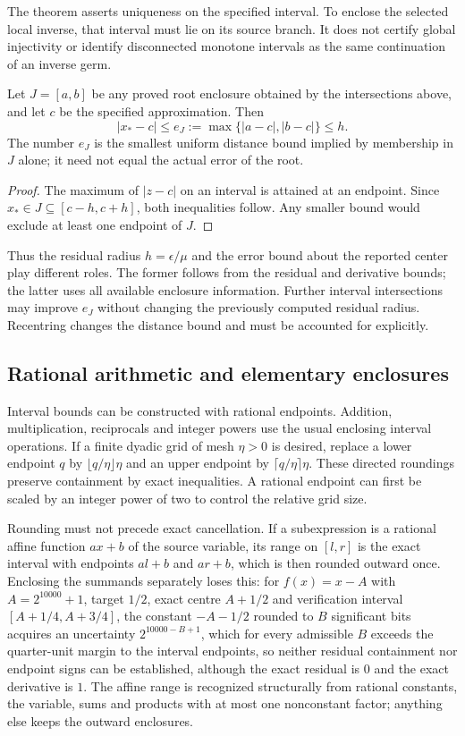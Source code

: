 The theorem asserts uniqueness on the specified interval. To enclose the selected local inverse, that interval must lie on its source branch. It does not
certify global injectivity or identify disconnected monotone intervals as the
same continuation of an inverse germ.

\begin{proposition}
\label{prop:sharp-enclosure-error}
Let $J=[a,b]$ be any proved root enclosure obtained by the intersections
above, and let $c$ be the specified approximation. Then
\[
 |x_*-c|\le e_J:=\max\{|a-c|,|b-c|\}\le h.
\]
The number $e_J$ is the smallest uniform distance bound implied by membership
in $J$ alone; it need not equal the actual error of the root.
\end{proposition}
\begin{proof}
The maximum of $|z-c|$ on an interval is attained at an endpoint. Since
$x_*\in J\subseteq[c-h,c+h]$, both inequalities follow. Any smaller bound
would exclude at least one endpoint of $J$.
\end{proof}

Thus the residual radius $h=\epsilon/\mu$ and the error bound about the
reported center play different roles. The former follows from the residual
and derivative bounds; the latter uses all available enclosure information.
Further interval intersections may improve $e_J$ without changing the
previously computed residual radius. Recentring changes the distance bound
and must be accounted for explicitly.

\subsection{Rational arithmetic and elementary enclosures}

Interval bounds can be constructed with rational endpoints. Addition,
multiplication, reciprocals and integer powers use the usual enclosing
interval operations. If a finite dyadic grid of mesh $\eta>0$ is desired,
replace a lower endpoint $q$ by $\lfloor q/\eta\rfloor\eta$ and an upper
endpoint by $\lceil q/\eta\rceil\eta$. These directed roundings preserve
containment by exact inequalities. A rational endpoint can first be scaled
by an integer power of two to control the relative grid size.

Rounding must not precede exact cancellation. If a subexpression is a
rational affine function $ax+b$ of the source variable, its range on
$[l,r]$ is the exact interval with endpoints $al+b$ and $ar+b$, which is
then rounded outward once. Enclosing the summands separately loses this:
for $f(x)=x-A$ with $A=2^{10000}+1$, target $1/2$, exact centre $A+1/2$
and verification interval $[A+1/4,A+3/4]$, the constant $-A-1/2$ rounded
to $B$ significant bits acquires an uncertainty $2^{10000-B+1}$, which for
every admissible $B$ exceeds the quarter-unit margin to the interval
endpoints, so neither residual containment nor endpoint signs can be
established, although the exact residual is $0$ and the exact derivative
is $1$. The affine range is recognized structurally from rational
constants, the variable, sums and products with at most one nonconstant
factor; anything else keeps the outward enclosures.

